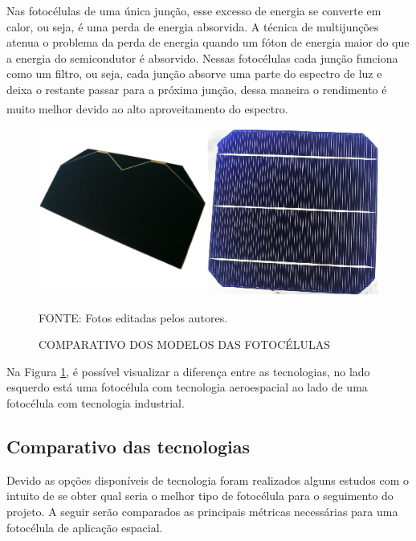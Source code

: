 \documentclass[
	12pt,				%
	openright,			%
	oneside,			%
	a4paper,			%
	english,			%
	french,				%
	spanish,			%
	brazil,				%
	oldfontcommands
	]{abntex2}
\begin{document}
	Nas fotocélulas de uma única junção, esse excesso de energia se converte em calor, ou seja, é uma perda de energia absorvida. A técnica de multijunções atenua o problema da perda de energia quando um fóton de energia maior do que a energia do semicondutor é absorvido. Nessas fotocélulas cada junção funciona como um filtro, ou seja, cada junção absorve uma parte do espectro de luz e deixa o restante passar para a próxima junção, dessa maneira o rendimento é muito melhor devido ao alto aproveitamento do espectro.\textsuperscript{\cite{Fatemi}}
	
	\begin{figure}[th]
		\caption{COMPARATIVO DOS MODELOS DAS FOTOCÉLULAS}
		\label{Fig_cells}
		\centering
		\includegraphics[width=0.7\linewidth]{./figs/cells}
			
		\begin{small}
			FONTE: Fotos editadas pelos autores.
		\end{small}		
	\end{figure}
	
	Na Figura \ref{Fig_cells}, é possível visualizar a diferença entre as tecnologias, no lado esquerdo está uma fotocélula com tecnologia aeroespacial ao lado de uma fotocélula com tecnologia industrial.
	
\subsection[Comparativo das tecnologias]{Comparativo das tecnologias}

	Devido as opções disponíveis de tecnologia foram realizados alguns estudos com o intuito de se obter qual seria o melhor tipo de fotocélula para o seguimento do projeto. A seguir serão comparados as principais métricas necessárias para uma fotocélula de aplicação espacial.
	
\end{document}
